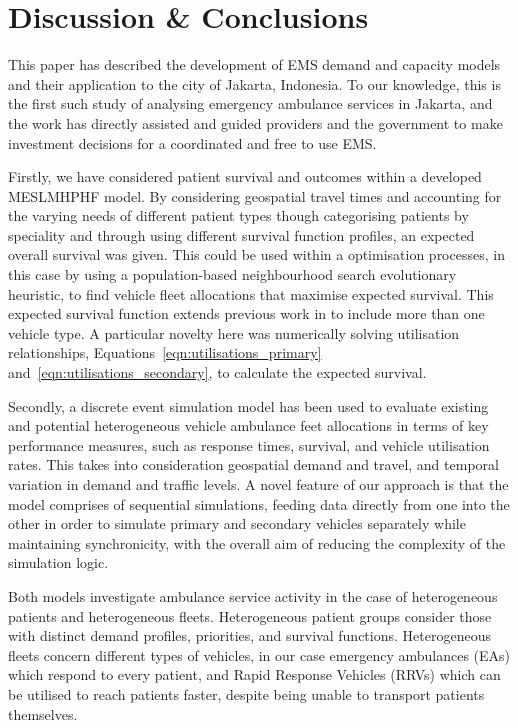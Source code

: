\documentclass[preprint,12pt]{elsarticle}
\begin{document}
\section{Discussion \& Conclusions}\label{sec:discussion}
This paper has described the development of EMS demand and capacity models and
their application to the city of Jakarta, Indonesia. To our knowledge, this is
the first such study of analysing emergency ambulance services in Jakarta, and
the work has directly assisted and guided providers and the government to make
investment decisions for a coordinated and free to use EMS.

Firstly, we have considered patient survival and outcomes within a developed
MESLMHPHF model. By considering geospatial travel times and accounting for the
varying needs of different patient types though categorising patients by
speciality and through using different survival function profiles, an expected
overall survival was given. This could be used within a optimisation
processes, in this case by using a population-based neighbourhood search
evolutionary heuristic, to find vehicle fleet allocations that maximise
expected survival. This expected survival function extends previous work in
\cite{Knight2012918} to include more than one vehicle type.
A particular novelty here was numerically solving utilisation relationships,
Equations~\ref{eqn:utilisations_primary} and~\ref{eqn:utilisations_secondary},
to calculate the expected survival.

Secondly, a discrete event simulation model has been used to evaluate existing
and potential heterogeneous vehicle ambulance feet allocations in terms of key
performance measures, such as response times, survival, and vehicle
utilisation rates. This takes into consideration geospatial demand and travel,
and temporal variation in demand and traffic levels. A novel feature of our
approach is that the model comprises of sequential simulations, feeding data
directly from one into the other in order to simulate primary and secondary
vehicles separately while maintaining synchronicity, with the overall aim of
reducing the complexity of the simulation logic.

Both models investigate ambulance service activity in the case of
heterogeneous patients and heterogeneous fleets. Heterogeneous patient groups
consider those with distinct demand profiles, priorities, and survival
functions. Heterogeneous fleets concern different types of vehicles, in our
case emergency ambulances (EAs) which respond to every patient, and Rapid
Response Vehicles (RRVs) which can be utilised to reach patients faster,
despite being unable to transport patients themselves.
\end{document}
